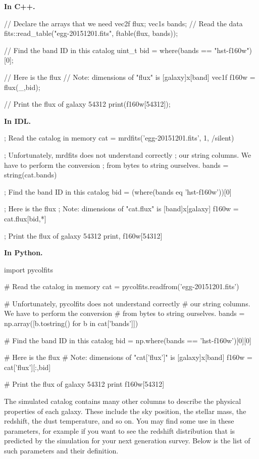 \documentclass[12pt,a4paper]{article}
\begin{document}
{\bf In C++.}
\begin{cppcode}
// Declare the arrays that we need
vec2f flux;
vec1s bands;
// Read the data
fits::read_table("egg-20151201.fits", ftable(flux, bands));

// Find the band ID in this catalog
uint_t bid = where(bands == "hst-f160w")[0];

// Here is the flux
// Note: dimensions of "flux" is [galaxy]x[band]
vec1f f160w = flux(_,bid);

// Print the flux of galaxy 54312
print(f160w[54312]);
\end{cppcode}

{\bf In IDL.}
\begin{idlcode}
; Read the catalog in memory
cat = mrdfits('egg-20151201.fits', 1, /silent)

; Unfortunately, mrdfits does not understand correctly
; our string columns. We have to perform the conversion
; from bytes to string ourselves.
bands = string(cat.bands)

; Find the band ID in this catalog
bid = (where(bands eq 'hst-f160w'))[0]

; Here is the flux
; Note: dimensions of "cat.flux" is [band]x[galaxy]
f160w = cat.flux[bid,*]

; Print the flux of galaxy 54312
print, f160w[54312]
\end{idlcode}

{\bf In Python.}
\begin{pythoncode}
import pycolfits

# Read the catalog in memory
cat = pycolfits.readfrom('egg-20151201.fits')

# Unfortunately, pycolfits does not understand correctly
# our string columns. We have to perform the conversion
# from bytes to string ourselves.
bands = np.array([b.tostring() for b in cat['bands']])

# Find the band ID in this catalog
bid = np.where(bands == 'hst-f160w')[0][0]

# Here is the flux
# Note: dimensions of "cat['flux']" is [galaxy]x[band]
f160w = cat['flux'][:,bid]

# Print the flux of galaxy 54312
print f160w[54312]
\end{pythoncode}

The simulated catalog contains many other columns to describe the physical properties of each galaxy. These include the sky position, the stellar mass, the redshift, the dust temperature, and so on. You may find some use in these parameters, for example if you want to see the redshift distribution that is predicted by the simulation for your next generation survey. Below is the list of such parameters and their definition.
\end{document}
